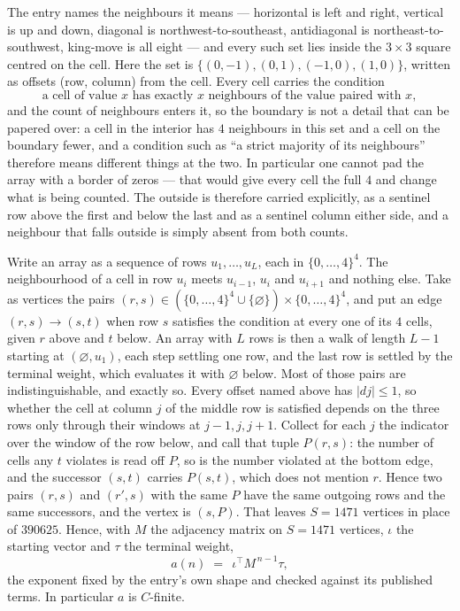 \documentclass[11pt,a4paper]{article}
\theoremstyle{plain}
\theoremstyle{definition}
\begin{document}
The entry names the neighbours it means --- horizontal is left and right, vertical is up and
down, diagonal is northwest-to-southeast, antidiagonal is northeast-to-southwest, king-move is
all eight --- and every such set lies inside the $3\times3$ square centred on the cell. Here
the set is $\{(0,-1), (0,1), (-1,0), (1,0)\}$, written as offsets (row, column) from the cell. Every cell carries
the condition
\[
\text{a cell of value }x\text{ has exactly }x\text{ neighbours of the value paired with }x,
\]
and the count of neighbours enters it, so the boundary is not a detail that can be papered
over: a cell in the interior has $4$ neighbours in this set and a cell on the boundary
fewer, and a condition such as ``a strict majority of its neighbours'' therefore means
different things at the two. In particular one cannot pad the array with a border of zeros ---
that would give every cell the full $4$ and change what is being counted. The outside is
therefore carried
explicitly, as a sentinel row above the first and below the last and as a sentinel column
either side, and a neighbour that falls outside is simply absent from both counts.

Write an array as a sequence of rows $u_1,\dots,u_L$, each in
$\{0,\dots,4\}^{4}$. The neighbourhood of a cell in row $u_i$ meets $u_{i-1}$,
$u_i$ and $u_{i+1}$ and nothing else. Take as vertices the pairs
$(r,s)\in(\{0,\dots,4\}^{4}\cup\{\varnothing\})\times\{0,\dots,4\}^{4}$,
and put an edge $(r,s)\to(s,t)$ when row $s$ satisfies the condition at every one of its
$4$ cells, given $r$ above and $t$ below. An array with $L$ rows is then a walk of length
$L-1$ starting at $(\varnothing,u_1)$, each step settling one row, and the last row is
settled by the terminal weight, which evaluates it with $\varnothing$ below. Most of those pairs are indistinguishable, and exactly so. Every offset named above has $|dj|\le 1$, so whether the cell at column $j$ of the middle row is satisfied depends on the three rows only through their windows at $j-1,j,j+1$. Collect for each $j$ the indicator over the window of the row below, and call that tuple $P(r,s)$: the number of cells any $t$ violates is read off $P$, so is the number violated at the bottom edge, and the successor $(s,t)$ carries $P(s,t)$, which does not mention $r$. Hence two pairs $(r,s)$ and $(r',s)$ with the same $P$ have the same outgoing rows and the same successors, and the vertex is $(s,P)$. That leaves $S=1471$ vertices in place of $390625$. Hence,
with $M$ the adjacency matrix on $S=1471$ vertices, $\iota$ the starting vector and $\tau$ the
terminal weight,
\[
a(n)\;=\;\,\iota^{\!\top}M^{\,n-1}\tau ,
\]
the exponent fixed by the entry's own shape and checked against its published terms. In
particular $a$ is $C$-finite.
\end{document}
